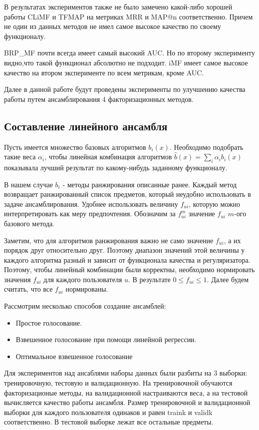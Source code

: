 \documentclass[a4paper,12pt]{article}
\begin{document}
 В результатах экспериментов также не  было замечено какой-либо хорошей работы CLiMF и TFMAP на метриках MRR и MAP@n соответственно. Причем не один из данных методов не имел самое высокое качество по своему функционалу. 
 
 BRP\_MF почти всегда имеет самый высокий AUC. Но по второму эксперименту видно,что такой функционал абсолютно не подходит. iMF имеет самое высокое качество на втором эксперименте по всем метрикам, кроме AUC. 
 
 Далее в данной работе будут проведены эксперименты по улучшению качества работы путем ансамблирования 4 факторизационных методов.

\subsection{Составление линейного  ансамбля}


Пусть имеется множество базовых алгоритмов $b_i(x)$. Необходимо подобрать такие веса $\alpha_i$, чтобы линейная комбинация алгоритмов $\hat{b}(x) = \sum_i \alpha_i b_i(x)$ показывала лучший результат по какому-нибудь заданному функционалу. 

В нашем случае $b_i$ - методы ранжирования описанные ранее. Каждый метод возвращает ранжированный список предметов, который неудобно использовать в задаче ансамблирования. Удобнее использовать величину $f_{ui}$, которую можно интерпретировать как меру предпочтения. Обозначим  за $f_{ui}^m$ значение $f_{ui}$ $m$-ого базового метода.

Заметим, что для алгоритмов ранжирования  важно не само значение $f_{ui}$, а их порядок друг относительно друг. Поэтому диапазон значений этой величины у каждого алгоритма разный и зависит от функционала качества и регуляризатора. Поэтому, чтобы линейный комбинации были корректны,  необходимо нормировать значения $f_{ui}$ для каждого пользователя $u$. В результате $0 \leq f_{ui} \leq 1$. Далее будем считать, что все $f_{ui}$ нормированы.

  Рассмотрим несколько способов создание ансамблей:
 
\begin{itemize}
\item Простое голосование. 
\item Взвешенное голосование при помощи линейной регрессии.
\item Оптимальное взвешенное голосование
\end{itemize}
Для экспериментов над ансаблями наборы данных были разбиты на 3 выборки: тренировочную, тестовую и валидационную. На тренировочной обучаются факторизационые методы, на валидационной настраиваются веса, а на тестовой вычисляется качество работы ансамбля. Размер тренировочной и валидационной выборки для каждого пользователя одинаков и равен traink и validk соответственно. В тестовой выборке лежат все остальные предметы.
\end{document}
